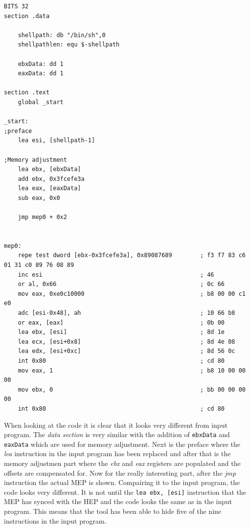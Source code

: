\documentclass[11pt,twoside]{eitExjobb}
\begin{document}
\begin{Verbatim}[fontsize=\tiny]
BITS 32
section .data

    shellpath: db "/bin/sh",0
    shellpathlen: equ $-shellpath

    ebxData: dd 1
    eaxData: dd 1

section .text
    global _start

_start:
;preface
    lea esi, [shellpath-1]

;Memory adjustment
    lea ebx, [ebxData]
    add ebx, 0x3fcefe3a
    lea eax, [eaxData]
    sub eax, 0x0

    jmp mep0 + 0x2


mep0:
    repe test dword [ebx-0x3fcefe3a], 0x89087689        ; f3 f7 83 c6 01 31 c0 89 76 08 89
    inc esi                                             ; 46
    or al, 0x66                                         ; 0c 66 
    mov eax, 0xe0c10000                                 ; b8 00 00 c1 e0
    adc [esi-0x48], ah                                  ; 10 66 b8
    or eax, [eax]                                       ; 0b 00
    lea ebx, [esi]                                      ; 8d 1e
    lea ecx, [esi+0x8]                                  ; 8d 4e 08
    lea edx, [esi+0xc]                                  ; 8d 56 0c
    int 0x80                                            ; cd 80
    mov eax, 1                                          ; b8 10 00 00 00
    mov ebx, 0                                          ; bb 00 00 00 00
    int 0x80                                            ; cd 80
\end{Verbatim}

\noindent When looking at the code it is clear that it looks very different from input program. The \emph{data section} is very similar with the addition of \texttt{ebxData} and \texttt{eaxData} which are used for memory adjustment. Next is the preface where the \emph{lea} instruction in the input program has been replaced and after that is the memory adjustmen part where the \emph{ebx} and \emph{eax} registers are populated and the offsets are compensated for. Now for the really interesting part, after the \emph{jmp} instruction the actual MEP is shown. Compairing it to the input program, the code looks very different. It is not until the \texttt{lea ebx, [esi]} instruction that the MEP has synced with the HEP and the code looks the same as in the input program. This means that the tool has been able to hide five of the nine instructions in the input program.
\end{document}
